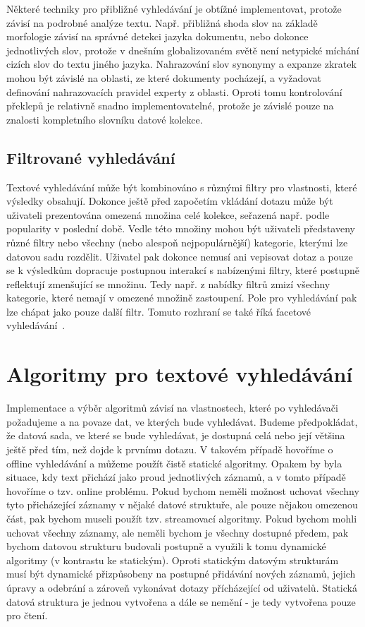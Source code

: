 \documentclass[11pt,letterpaper,oneside,openright]{book}
\begin{document}
Některé techniky pro přibližné vyhledávání je obtížné implementovat, protože
závisí na podrobné analýze textu. Např. přibližná shoda slov na základě
morfologie závisí na správné detekci jazyka dokumentu, nebo dokonce
jednotlivých slov, protože v dnešním globalizovaném světě není netypické
míchání cizích slov do textu jiného jazyka.  Nahrazování slov synonymy a
expanze zkratek mohou být závislé na oblasti, ze které dokumenty pocházejí, a
vyžadovat definování nahrazovacích pravidel experty z oblasti. Oproti tomu
kontrolování překlepů je relativně snadno implementovatelné, protože je závislé
pouze na znalosti kompletního slovníku datové kolekce.

\subsection{Filtrované vyhledávání} \label{sec:faceted_search}
Textové vyhledávání může být kombinováno s různými filtry pro vlastnosti, které
výsledky obsahují. Dokonce ještě před započetím vkládání dotazu může být
uživateli prezentována omezená množina celé kolekce, seřazená např. podle
popularity v poslední době. Vedle této množiny mohou být uživateli představeny
různé filtry nebo všechny (nebo alespoň nejpopulárnější) kategorie, kterými lze
datovou sadu rozdělit. Uživatel pak dokonce nemusí ani vepisovat dotaz a pouze
se k výsledkům dopracuje postupnou interakcí s nabízenými filtry, které
postupně reflektují zmenšující se množinu. Tedy např. z nabídky filtrů zmizí
všechny kategorie, které nemají v omezené množině zastoupení. Pole pro
vyhledávání pak lze chápat jako pouze další filtr. Tomuto rozhraní se také říká
facetové vyhledávání~\cite{tunkelang2009faceted}.


\newpage
\section{Algoritmy pro textové vyhledávání}
Implementace a výběr algoritmů závisí na vlastnostech, které po vyhledávači
požadujeme a na povaze dat, ve kterých bude vyhledávat. Budeme předpokládat, že
datová sada, ve které se bude vyhledávat, je dostupná celá nebo její většina
ještě před tím, než dojde k prvnímu dotazu. V takovém případě hovoříme o
offline vyhledávání a můžeme použít čistě statické algoritmy.  Opakem by byla
situace, kdy text přichází jako proud jednotlivých záznamů, a v tomto případě
hovoříme o tzv. online problému. Pokud bychom neměli možnost uchovat všechny
tyto přicházející záznamy v nějaké datové struktuře, ale pouze nějakou omezenou
část, pak bychom museli použít tzv. streamovací algoritmy. Pokud bychom mohli
uchovat všechny záznamy, ale neměli bychom je všechny dostupné předem, pak
bychom datovou strukturu budovali postupně a využili k tomu dynamické algoritmy
(v kontrastu ke statickým). Oproti statickým datovým strukturám musí být
dynamické přizpůsobeny na postupné přidávání nových záznamů, jejich úpravy a
odebrání a zároveň vykonávat dotazy přícházející od uživatelů. Statická datová
struktura je jednou vytvořena a dále se nemění - je tedy vytvořena pouze pro
čtení.
\end{document}
